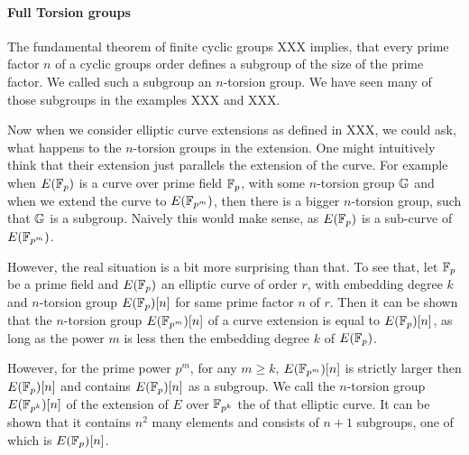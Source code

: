 \paragraph{Full Torsion groups} The fundamental theorem of finite cyclic groups XXX implies, that every prime factor $n$ of a cyclic groups order defines a subgroup of the size of the prime factor. We called such a subgroup an $n$-torsion group. We have seen many of those subgroups in the examples XXX and XXX.

Now when we consider elliptic curve extensions as defined in XXX, we could ask, what happens to the $n$-torsion groups in the extension. One might intuitively think that their extension just parallels the extension of the curve. For example when $E(\mathbb{F}_p)$ is a curve over prime field $\mathbb{F}_p$, with some $n$-torsion group $\mathbb{G}$ and when we extend the curve to $E(\mathbb{F}_{p^m})$, then there is a bigger $n$-torsion group, such that $\mathbb{G}$ is a subgroup. Naively this would make sense, as $E(\mathbb{F}_p)$ is a sub-curve of $E(\mathbb{F}_{p^m})$. 

However, the real situation is a bit more surprising than that. To see that, let $\mathbb{F}_p$ be a prime field and $E(\mathbb{F}_p)$ an elliptic curve of order $r$, with embedding degree $k$ and $n$-torsion group $E(\mathbb{F}_p)[n]$ for same prime factor $n$ of $r$. Then it can be shown that the $n$-torsion group $E(\mathbb{F}_{p^m})[n]$ of a curve extension is equal to $E(\mathbb{F}_p)[n]$, as long as the power $m$ is less then the embedding degree $k$ of $E(\mathbb{F}_p)$. 

However, for the prime power $p^m$, for any $m\geq k$, $E(\mathbb{F}_{p^m})[n]$ is strictly larger then $E(\mathbb{F}_p)[n]$ and contains $E(\mathbb{F}_p)[n]$ as a subgroup. We call the $n$-torsion group $E(\mathbb{F}_{p^k})[n]$ of the extension of $E$ over $\mathbb{F}_{p^k}$ the  of that elliptic curve. It can be shown that it contains $n^2$ many elements and consists of $n+1$ subgroups, one of which is $E(\mathbb{F}_{p})[n]$.

